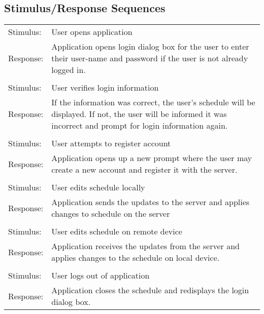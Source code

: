 \documentclass{scrreprt}
\begin{document}
\subsection{Stimulus/Response Sequences}
\begin{center}
    \begin{tabular}{ p{2cm} p{13cm} }
    Stimulus: & User opens application\\
    Response: & Application opens login dialog box for the user to enter their user-name
    and password if the user is not already logged in.\\
    \\
    Stimulus: & User verifies login information\\
    Response: & If the information was correct, the user's schedule will be displayed.
    If not, the user will be informed it was incorrect and prompt for login information
    again.\\
    \\
    Stimulus: & User attempts to register account\\
    Response: & Application opens up a new prompt where the user may create a new
    account and register it with the server.\\
    \\
    Stimulus: & User edits schedule locally\\
    Response: & Application sends the updates to the server and applies changes to
    schedule on the server\\
    \\
    Stimulus: & User edits schedule on remote device\\
    Response: & Application receives the updates from the server and applies changes
    to the schedule on local device.\\
    \\
    Stimulus: & User logs out of application\\
    Response: & Application closes the schedule and redisplays the login dialog box.\\
    \end{tabular}
\end{center}
\end{document}
